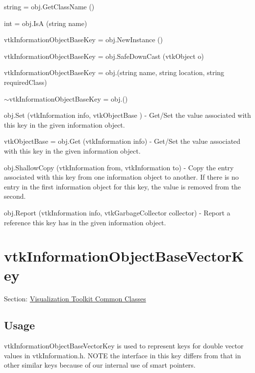 \begin{DoxyItemize}
\item {\ttfamily string = obj.\-Get\-Class\-Name ()}  
\item {\ttfamily int = obj.\-Is\-A (string name)}  
\item {\ttfamily vtk\-Information\-Object\-Base\-Key = obj.\-New\-Instance ()}  
\item {\ttfamily vtk\-Information\-Object\-Base\-Key = obj.\-Safe\-Down\-Cast (vtk\-Object o)}  
\item {\ttfamily vtk\-Information\-Object\-Base\-Key = obj.(string name, string location, string required\-Class)}  
\item {\ttfamily $\sim$vtk\-Information\-Object\-Base\-Key = obj.()}  
\item {\ttfamily obj.\-Set (vtk\-Information info, vtk\-Object\-Base )} -\/ Get/\-Set the value associated with this key in the given information object.  
\item {\ttfamily vtk\-Object\-Base = obj.\-Get (vtk\-Information info)} -\/ Get/\-Set the value associated with this key in the given information object.  
\item {\ttfamily obj.\-Shallow\-Copy (vtk\-Information from, vtk\-Information to)} -\/ Copy the entry associated with this key from one information object to another. If there is no entry in the first information object for this key, the value is removed from the second.  
\item {\ttfamily obj.\-Report (vtk\-Information info, vtk\-Garbage\-Collector collector)} -\/ Report a reference this key has in the given information object.  
\end{DoxyItemize}\hypertarget{vtkcommon_vtkinformationobjectbasevectorkey}{}\section{vtk\-Information\-Object\-Base\-Vector\-Key}\label{vtkcommon_vtkinformationobjectbasevectorkey}
Section\-: \hyperlink{sec_vtkcommon}{Visualization Toolkit Common Classes} \hypertarget{vtkwidgets_vtkxyplotwidget_Usage}{}\subsection{Usage}\label{vtkwidgets_vtkxyplotwidget_Usage}
vtk\-Information\-Object\-Base\-Vector\-Key is used to represent keys for double vector values in vtk\-Information.\-h. N\-O\-T\-E the interface in this key differs from that in other similar keys because of our internal use of smart pointers.

